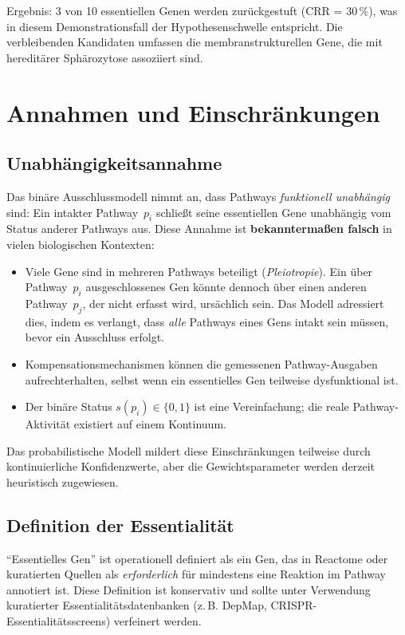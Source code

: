 \documentclass[12pt,a4paper]{article}
\begin{document}
Ergebnis: 3 von 10 essentiellen Genen werden zurückgestuft (CRR = 30\,\%), was in diesem Demonstrationsfall der Hypothesenschwelle entspricht. Die verbleibenden Kandidaten umfassen die membranstrukturellen Gene, die mit hereditärer Sphäro\-zytose assoziiert sind.

\section{Annahmen und Einschränkungen}
\label{sec:limitations}

\subsection{Unabhängigkeitsannahme}

Das binäre Ausschlussmodell nimmt an, dass Pathways \emph{funktionell unabhängig} sind: Ein intakter Pathway~$p_i$ schließt seine essentiellen Gene unabhängig vom Status anderer Pathways aus. Diese Annahme ist \textbf{bekanntermaßen falsch} in vielen biologischen Kontexten:

\begin{itemize}
    \item Viele Gene sind in mehreren Pathways beteiligt (\emph{Pleiotropie}). Ein über Pathway~$p_i$ ausgeschlossenes Gen könnte dennoch über einen anderen Pathway~$p_j$, der nicht erfasst wird, ursächlich sein. Das Modell adressiert dies, indem es verlangt, dass \emph{alle} Pathways eines Gens intakt sein müssen, bevor ein Ausschluss erfolgt.
    \item Kompensationsmechanismen können die gemessenen Pathway-Ausgaben aufrechterhalten, selbst wenn ein essentielles Gen teilweise dysfunktional ist.
    \item Der binäre Status $s(p_i) \in \{0, 1\}$ ist eine Vereinfachung; die reale Pathway-Aktivität existiert auf einem Kontinuum.
\end{itemize}

Das probabilistische Modell mildert diese Einschränkungen teilweise durch kontinuierliche Konfidenzwerte, aber die Gewichtsparameter werden derzeit heuristisch zugewiesen.

\subsection{Definition der Essentialität}

"`Essentielles Gen"' ist operationell definiert als ein Gen, das in Reactome oder kuratierten Quellen als \emph{erforderlich} für mindestens eine Reaktion im Pathway annotiert ist. Diese Definition ist konservativ und sollte unter Verwendung kuratierter Essentialitätsdatenbanken (z.\,B. DepMap, CRISPR-Essentialitätsscreens) verfeinert werden.
\end{document}
